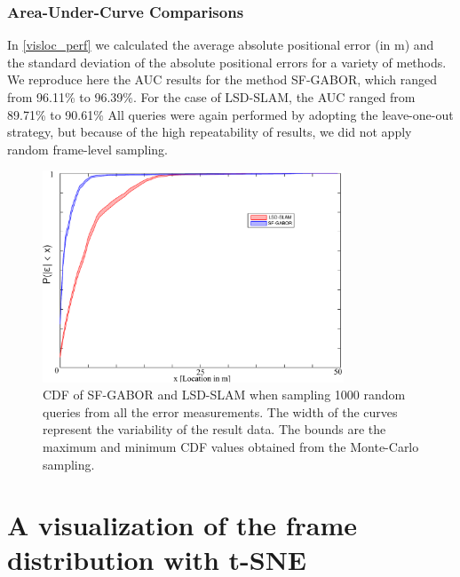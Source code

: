 \subsubsection{Area-Under-Curve Comparisons}
In \ref{visloc_perf} we calculated the average absolute positional error (in m) and the standard deviation of the absolute positional errors for a variety of methods. We reproduce here the AUC results for the method SF-GABOR, which ranged from 96.11\% to 96.39\%. For the case of LSD-SLAM, the AUC ranged from 89.71\% to 90.61\% All queries were again performed by adopting the leave-one-out strategy, but because of the high repeatability of results, we did not apply random frame-level sampling.  


\begin{figure}[h]
\centering
\includegraphics[width=0.8\textwidth]{gfx/Chapter06/SF_GABORvsLSD_SLAM.pdf}
\caption{CDF of SF-GABOR and LSD-SLAM when sampling 1000 random queries from all the error measurements. The width of the curves represent the variability of the result data. The bounds are the maximum and minimum CDF values obtained from the Monte-Carlo sampling.}
\label{fig:cdf}
\end{figure}



\section{A visualization of the frame distribution with t-SNE}

